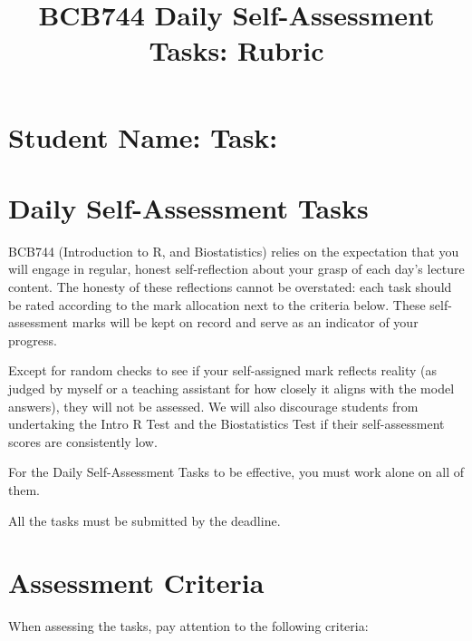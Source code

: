 \documentclass[a4paper,10pt]{article}
\title{\textbf{BCB744 Daily Self-Assessment Tasks: Rubric}}
\author{}
\date{}
\begin{document}
\maketitle

\section*{Student Name: \underline{\hspace{5cm}} Task: \underline{\hspace{5cm}}}

\section*{Daily Self-Assessment Tasks}
BCB744 (Introduction to R, and Biostatistics) relies on the expectation that you will engage in regular, honest self-reflection about your grasp of each day’s lecture content. The honesty of these reflections cannot be overstated: each task should be rated according to the mark allocation next to the criteria below.
These self-assessment marks will be kept on record and serve as an indicator of your progress.
\vspace{12pt}

\noindent Except for random checks to see if your self-assigned mark reflects reality (as judged by myself or a teaching assistant for how closely it aligns with the model answers), they will not be assessed. We will also discourage students from undertaking the Intro R Test and the Biostatistics Test if their self-assessment scores are consistently low.
\vspace{12pt}

\noindent For the Daily Self-Assessment Tasks to be effective, you must work alone on all of them.
\vspace{12pt}

\noindent All the tasks must be submitted by the deadline.

\section*{Assessment Criteria}
When assessing the tasks, pay attention to the following criteria:
\end{document}
